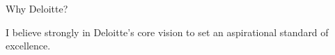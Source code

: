 \begin{cventries}
  \cventry
    {Why Deloitte?}
    {}
    {}
    {}
    {
      \begin{cvitems}
        \item {I believe strongly in Deloitte’s core vision to set an aspirational standard of excellence.}
      \end{cvitems}
    }
\end{cventries}
